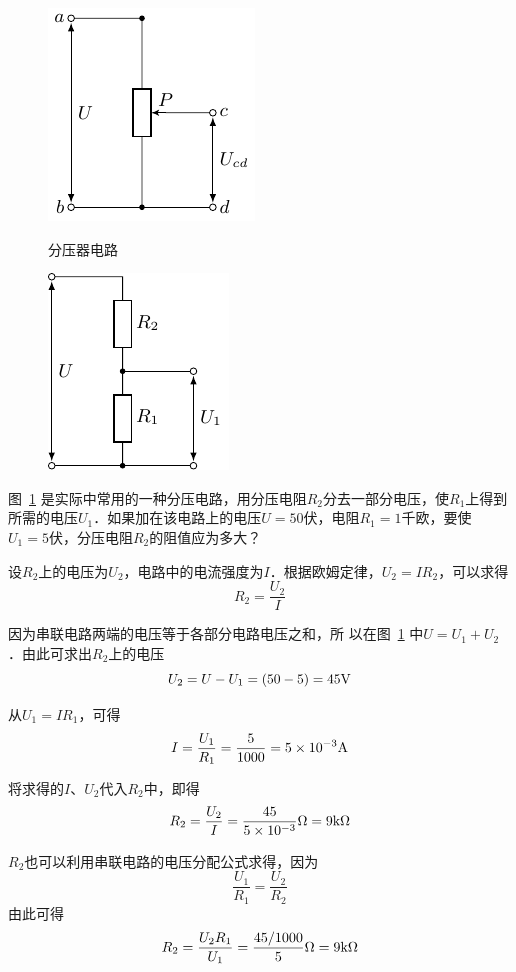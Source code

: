 \begin{figure}[htbp]
    \centering
    \begin{minipage}[t]{0.48\textwidth}
        \centering
        \includegraphics{fig/B/7-7.pdf}
        \caption{分压器电路}\label{fig_B_7-7}
    \end{minipage}
    \begin{minipage}[t]{0.48\textwidth}
        \centering
        \includegraphics{fig/B/7-8.pdf}
        \caption{}\label{fig_B_7-8}
    \end{minipage}
\end{figure}

\begin{example}
    图~\ref{fig_B_7-8} 是实际中常用的一种分压电路，用分压电阻$R_2$分去一部分电压，使$R_1$上得到所需的电压$U_1$．如果加在该电路上的电压$U=50$伏，电阻$R_1=1$千欧，要使$U_1=
    5$伏，分压电阻$R_2$的阻值应为多大？
\end{example}


\begin{solution}
    设$R_2$上的电压为$U_2$，电路中的电流强度为$I$．根据欧姆定律，$U_2=IR_2$，可以求得
    \[R_2=\frac{U_2}{I}\]

因为串联电路两端的电压等于各部分电路电压之和，所
以在图~\ref{fig_B_7-8} 中$U=U_1+U_2$．由此可求出$R_2$上的电压
\[U_2=U-U_1=(50-5)=45{\rm V}\]

从$U_1=IR_1$，可得
\[ I=\frac{U_1}{R_1}=\frac{5}{1000}=5\times10^{-3}{\rm A}\]

将求得的$I$、$U_2$代入$R_2$中，即得
\[R_2=\frac{U_2}{I}=\frac{45}{5\times10^{-3}}\Omega=9{\rm k}\Omega\]

$R_2$也可以利用串联电路的电压分配公式求得，因为
\[\frac{U_1}{R_1}=\frac{U_2}{R_2}\]
由此可得
\[R_2=\frac{U_2R_1}{U_1}=\frac{45/1000}{5}\Omega=9{\rm k}\Omega \]
\end{solution}

